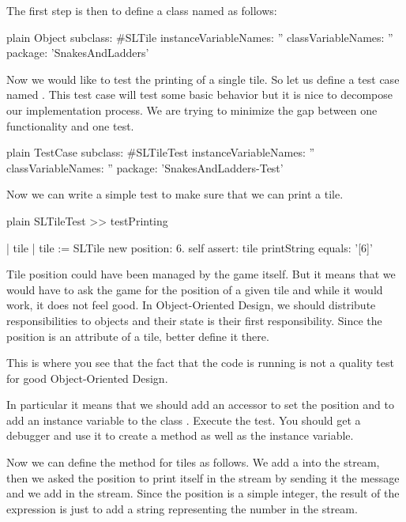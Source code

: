 \documentclass[10pt,twoside,english]{_support/latex/sbabook/sbabook}
\begin{document}
The first step is then to define a class named  as follows:

\begin{displaycode}{plain}
Object subclass: #SLTile
	instanceVariableNames: ''
	classVariableNames: ''
	package: 'SnakesAndLadders'
\end{displaycode}

Now we would like to test the printing of a single tile. So let us define a test case named . This test case will test some basic behavior but it is nice to decompose our
implementation process. We are trying to minimize the gap between one functionality and one test.

\begin{displaycode}{plain}
TestCase subclass: #SLTileTest
	instanceVariableNames: ''
	classVariableNames: ''
	package: 'SnakesAndLadders-Test'
\end{displaycode}

Now we can write a simple test to make sure that we can print a tile.

\begin{displaycode}{plain}
SLTileTest >> testPrinting

	| tile |
	tile := SLTile new position: 6.
	self assert: tile printString equals: '[6]'
\end{displaycode}

Tile position could have been managed by the game itself.  But it means that we would have to ask the game for the position of a given tile and while it would work, it does not feel good.
In Object-Oriented Design, we should distribute responsibilities to objects and their state is their first responsibility. Since the position is an attribute of a tile, better define it there.

This is where you see that the fact that the code is running is not a quality test for good Object-Oriented Design.

In particular it means that we should add an accessor to set the position and to add an instance variable  to the class . Execute the test. You should get a debugger and use it to create a method  as well as the instance variable.

Now we can define the  method for tiles as follows.
We add a \textcode{{[}} into the stream, then we asked the position to print itself in the stream by sending it the message  and we add \textcode{{]}}
in the stream. Since the position is a simple integer, the result of the  expression is just to add a string representing the number in the stream. 
\end{document}
